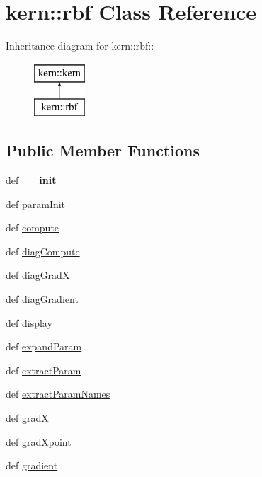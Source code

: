 \hypertarget{classkern_1_1rbf}{
\section{kern::rbf Class Reference}
\label{classkern_1_1rbf}
}
Inheritance diagram for kern::rbf::\begin{figure}[H]
\begin{center}
\leavevmode
\includegraphics[height=2cm]{classkern_1_1rbf}
\end{center}
\end{figure}
\subsection*{Public Member Functions}
\begin{CompactItemize}
\item 
\hypertarget{classkern_1_1rbf_7ffa7cfcd57ac9cfeb73493edb813213}{
def \textbf{\_\-\_\-init\_\-\_\-}}
\label{classkern_1_1rbf_7ffa7cfcd57ac9cfeb73493edb813213}

\item 
def \hyperlink{classkern_1_1rbf_b027910bf4a6f9e6ca1b5cbaa0caae9e}{paramInit}
\item 
def \hyperlink{classkern_1_1rbf_be3823a7db917ca61725cb5083b0622b}{compute}
\item 
def \hyperlink{classkern_1_1rbf_5c3835b3bc757a209995a697670c972f}{diagCompute}
\item 
def \hyperlink{classkern_1_1rbf_eda4e0ee73de97348afe5ba685c6c8fe}{diagGradX}
\item 
def \hyperlink{classkern_1_1rbf_0bcf6593046cfb84aef5f9e19b8c5ab5}{diagGradient}
\item 
def \hyperlink{classkern_1_1rbf_20fdea38a18a1f81907c5a7d11d0eb22}{display}
\item 
def \hyperlink{classkern_1_1rbf_c514b52ff98203ead791b7f7a9c35469}{expandParam}
\item 
def \hyperlink{classkern_1_1rbf_bae71f49c71ee4a2f1c072e5262a8d07}{extractParam}
\item 
def \hyperlink{classkern_1_1rbf_612d8dca7710da14b51fd06e4cb52de4}{extractParamNames}
\item 
def \hyperlink{classkern_1_1rbf_8a5245cf870c42271886116e5e36281c}{gradX}
\item 
def \hyperlink{classkern_1_1rbf_c3778a9ca05e365081c672b370591558}{gradXpoint}
\item 
def \hyperlink{classkern_1_1rbf_baceff6cd7ac7bdc69d5797dff72c5d2}{gradient}
\end{CompactItemize}
